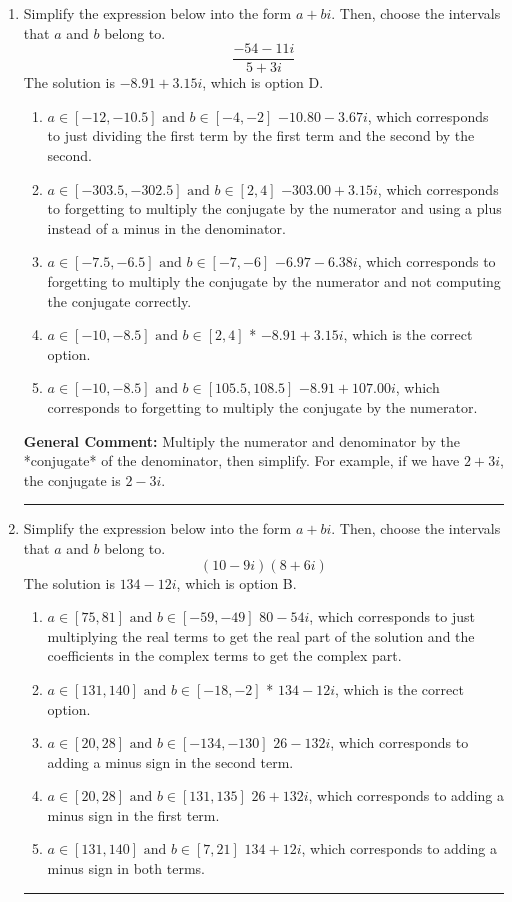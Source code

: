 \documentclass{extbook}[14pt]
\newcommand{\litem}[1]{\item #1

\rule{\textwidth}{0.4pt}}
\begin{document}
\begin{enumerate}\litem{
Simplify the expression below into the form $a+bi$. Then, choose the intervals that $a$ and $b$ belong to.
\[ \frac{-54 - 11 i}{5 + 3 i} \]
The solution is \( -8.91  + 3.15 i \), which is option D.\begin{enumerate}[label=\Alph*.]
\item \( a \in [-12, -10.5] \text{ and } b \in [-4, -2] \)
 $-10.80  - 3.67 i$, which corresponds to just dividing the first term by the first term and the second by the second.
\item \( a \in [-303.5, -302.5] \text{ and } b \in [2, 4] \)
 $-303.00  + 3.15 i$, which corresponds to forgetting to multiply the conjugate by the numerator and using a plus instead of a minus in the denominator.
\item \( a \in [-7.5, -6.5] \text{ and } b \in [-7, -6] \)
 $-6.97  - 6.38 i$, which corresponds to forgetting to multiply the conjugate by the numerator and not computing the conjugate correctly.
\item \( a \in [-10, -8.5] \text{ and } b \in [2, 4] \)
* $-8.91  + 3.15 i$, which is the correct option.
\item \( a \in [-10, -8.5] \text{ and } b \in [105.5, 108.5] \)
 $-8.91  + 107.00 i$, which corresponds to forgetting to multiply the conjugate by the numerator.
\end{enumerate}

\textbf{General Comment:} Multiply the numerator and denominator by the *conjugate* of the denominator, then simplify. For example, if we have $2+3i$, the conjugate is $2-3i$.
}
\litem{
Simplify the expression below into the form $a+bi$. Then, choose the intervals that $a$ and $b$ belong to.
\[ (10 - 9 i)(8 + 6 i) \]
The solution is \( 134 - 12 i \), which is option B.\begin{enumerate}[label=\Alph*.]
\item \( a \in [75, 81] \text{ and } b \in [-59, -49] \)
 $80 - 54 i$, which corresponds to just multiplying the real terms to get the real part of the solution and the coefficients in the complex terms to get the complex part.
\item \( a \in [131, 140] \text{ and } b \in [-18, -2] \)
* $134 - 12 i$, which is the correct option.
\item \( a \in [20, 28] \text{ and } b \in [-134, -130] \)
 $26 - 132 i$, which corresponds to adding a minus sign in the second term.
\item \( a \in [20, 28] \text{ and } b \in [131, 135] \)
 $26 + 132 i$, which corresponds to adding a minus sign in the first term.
\item \( a \in [131, 140] \text{ and } b \in [7, 21] \)
 $134 + 12 i$, which corresponds to adding a minus sign in both terms.
\end{enumerate}

}
\end{enumerate}
\end{document}
